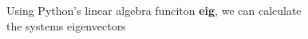 \documentclass[preview]{standalone}
\begin{document}
\begin{center}
\raggedright
                Using Python's linear algebra funciton \textbf{eig}, we can calculate \\
                the systems eigenvectors
\end{center}
\end{document}
